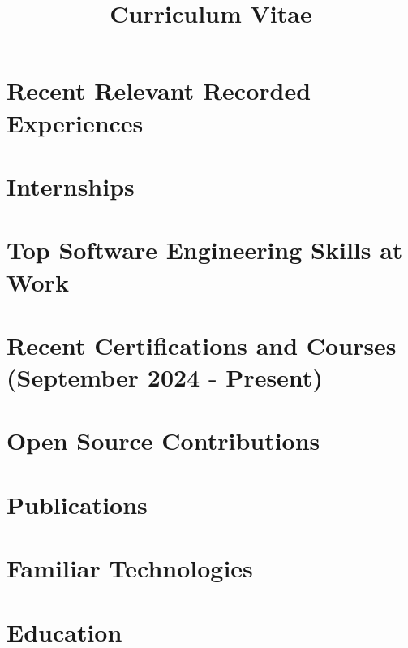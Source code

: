 \documentclass[13.12pt,a4paper,sans,colorlinks,urlcolor=violet, hyperindex,plainpages=false,bookmarksopen,bookmarksnumbered,pdfusetitle]{moderncv}
\title{Curriculum Vitae}
\begin{document}
\hypersetup{urlcolor=violet}

\makecvtitle
\vspace{-3em}



\vspace{-1em}

\section{Recent Relevant Recorded Experiences}


\vspace{0.5em}



\section{Internships}


\section{Top Software Engineering Skills at \textbf{Work}}



\section{Recent Certifications and Courses (September 2024 - Present)}


\section{Open Source Contributions}


\section{Publications}


\section{Familiar Technologies}


\section{Education}


\vspace{0.5em}


\end{document}
